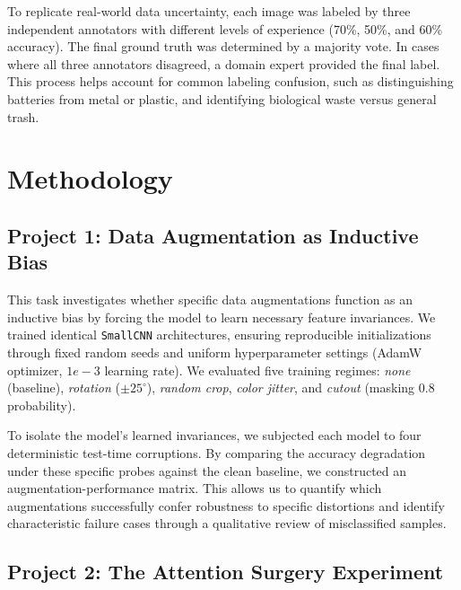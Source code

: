 \documentclass[12pt,a4paper]{article}
\begin{document}
To replicate real-world data uncertainty, each image was labeled by three independent annotators with different levels of experience (70\%, 50\%, and 60\% accuracy). The final ground truth was determined by a majority vote. In cases where all three annotators disagreed, a domain expert provided the final label. This process helps account for common labeling confusion, such as distinguishing batteries from metal or plastic, and identifying biological waste versus general trash.

\vspace{2em}

\section{Methodology}

\vspace{1.5em}

\subsection{Project 1: Data Augmentation as Inductive Bias}

This task investigates whether specific data augmentations function as an inductive bias by forcing the model to learn necessary feature invariances. We trained identical \texttt{SmallCNN} architectures, ensuring reproducible initializations through fixed random seeds and uniform hyperparameter settings (AdamW optimizer, $1e-3$ learning rate). We evaluated five training regimes: \textit{none} (baseline), \textit{rotation} ($\pm 25^{\circ}$), \textit{random crop}, \textit{color jitter}, and \textit{cutout} (masking $0.8$ probability).

To isolate the model's learned invariances, we subjected each model to four deterministic test-time corruptions. By comparing the accuracy degradation under these specific probes against the clean baseline, we constructed an augmentation-performance matrix. This allows us to quantify which augmentations successfully confer robustness to specific distortions and identify characteristic failure cases through a qualitative review of misclassified samples.

\vspace{1em}

\subsection{Project 2: The Attention Surgery Experiment}
\end{document}
